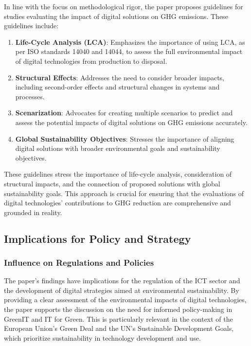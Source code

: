 \documentclass[conference,compsoc]{IEEEtran}
\begin{document}
In line with the  focus on methodological rigor, the paper proposes guidelines for studies evaluating the impact of digital solutions on GHG emissions. These guidelines include:
\begin{enumerate}
	\item \textbf{Life-Cycle Analysis (LCA)}: Emphasizes the importance of using LCA, as per ISO standards 14040 and 14044, to assess the full environmental impact of digital technologies from production to disposal.
	\item \textbf{Structural Effects}: Addresses the need to consider broader impacts, including second-order effects and structural changes in systems and processes.
	\item \textbf{Scenarization}: Advocates for creating multiple scenarios to predict and assess the potential impacts of digital solutions on GHG emissions accurately.
	\item \textbf{Global Sustainability Objectives}: Stresses the importance of aligning digital solutions with broader environmental goals and sustainability objectives.
\end{enumerate}
These guidelines stress the importance of life-cycle analysis, consideration of structural impacts, and the connection of proposed solutions with global sustainability goals. This approach is crucial for ensuring that the evaluations of digital technologies' contributions to GHG reduction are comprehensive and grounded in reality.

\subsection{Implications for Policy and Strategy}

\subsubsection{Influence on Regulations and Policies}

The paper's findings have implications for the regulation of the ICT sector and the development of digital strategies aimed at environmental sustainability. By providing a clear assessment of the environmental impacts of digital technologies, the paper supports the  discussion on the need for informed policy-making in GreenIT and IT for Green. This is particularly relevant in the context of the European Union's Green Deal and the UN's Sustainable Development Goals, which prioritize sustainability in technology development and use.
\end{document}
